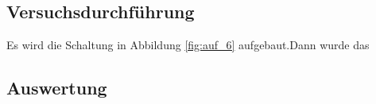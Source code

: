 \documentclass[12pt,a4paper]{article}
\begin{document}
\subsection*{Versuchsdurchführung}

Es wird die Schaltung in Abbildung \ref{fig:auf_6} aufgebaut.Dann wurde das 

\subsection*{Auswertung}
\end{document}
